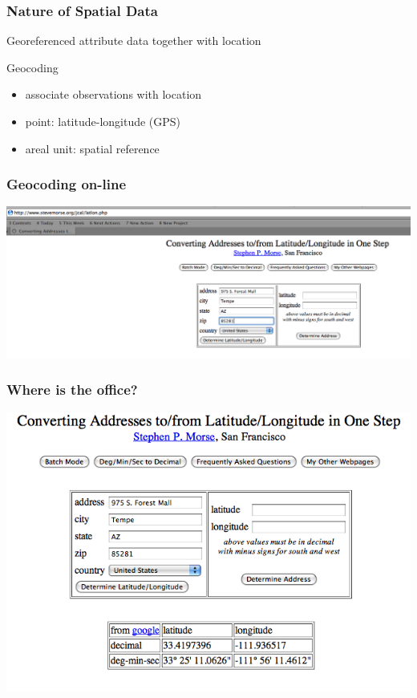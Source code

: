 \documentclass[nototal]{beamer}
\begin{document}
\begin{frame}
	\frametitle{Nature of Spatial Data}
 
\begin{block}{Georeferenced}
  attribute data together with location
 \end{block} 
\begin{block}{Geocoding}
 \begin{itemize}
 \item  associate observations with location
 \item  point: latitude-longitude (GPS)
 \item  areal unit: spatial reference
 \end{itemize}
 \end{block} \end{frame} 

\begin{frame}
	\frametitle{Geocoding on-line}
    \begin{center}
      \includegraphics[width=.65\linewidth]{geocode1.png}
    \end{center}
 \end{frame} 

\begin{frame}
	\frametitle{Where is the office?}
    \begin{center}
      \includegraphics[width=.65\linewidth]{geocode2.png}
    \end{center}
 \end{frame} 
\end{document}
